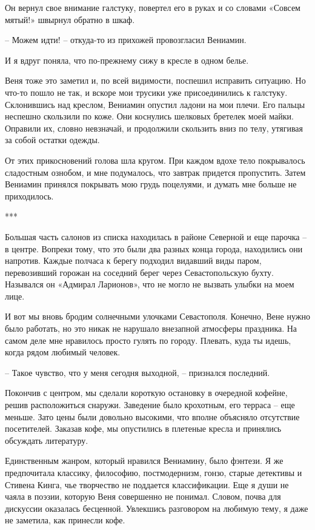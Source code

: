 \documentclass[
]{book}
\begin{document}
Он вернул свое внимание галстуку, повертел его в руках и со словами «Совсем мятый!» швырнул обратно в шкаф.

-- Можем идти! -- откуда-то из прихожей провозгласил Вениамин.

И я вдруг поняла, что по-прежнему сижу в кресле в одном белье.

Веня тоже это заметил и, по всей видимости, поспешил исправить ситуацию. Но что-то пошло не так, и вскоре мои трусики уже присоединились к галстуку. Склонившись над креслом, Вениамин опустил ладони на мои плечи. Его пальцы неспешно скользили по коже. Они коснулись шелковых бретелек моей майки. Оправили их, словно невзначай, и продолжили скользить вниз по телу, утягивая за собой остатки одежды.

От этих прикосновений голова шла кругом. При каждом вдохе тело покрывалось сладостным ознобом, и мне подумалось, что завтрак придется пропустить. Затем Вениамин принялся покрывать мою грудь поцелуями, и думать мне больше не приходилось.

***

Большая часть салонов из списка находилась в районе Северной и еще парочка -- в центре. Вопреки тому, что это были два разных конца города, находились они напротив. Каждые полчаса к берегу подходил видавший виды паром, перевозивший горожан на соседний берег через Севастопольскую бухту. Назывался он «Адмирал Ларионов», что не могло не вызвать улыбки на моем лице.

И вот мы вновь бродим солнечными улочками Севастополя. Конечно, Вене нужно было работать, но это никак не нарушало внезапной атмосферы праздника. На самом деле мне нравилось просто гулять по городу. Плевать, куда ты идешь, когда рядом любимый человек.

-- Такое чувство, что у меня сегодня выходной, -- признался последний.

Покончив с центром, мы сделали короткую остановку в очередной кофейне, решив расположиться снаружи. Заведение было крохотным, его терраса -- еще меньше. Зато цены были довольно высокими, что вполне объясняло отсутствие посетителей. Заказав кофе, мы опустились в плетеные кресла и принялись обсуждать литературу.

Единственным жанром, который нравился Вениамину, было фэнтези. Я же предпочитала классику, философию, постмодернизм, гонзо, старые детективы и Стивена Кинга, чье творчество не поддается классификации. Еще я души не чаяла в поэзии, которую Веня совершенно не понимал. Словом, почва для дискуссии оказалась бесценной. Увлекшись разговором на любимую тему, я даже не заметила, как принесли кофе.
\end{document}
